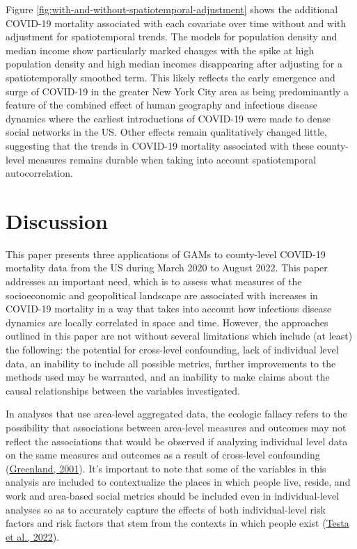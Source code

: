 \documentclass[
]{article}
\begin{document}
Figure \ref{fig:with-and-without-spatiotemporal-adjustment} shows the
additional COVID-19 mortality associated with each covariate over time without and
with adjustment for spatiotemporal trends. The models for population density
and median income show particularly marked changes with the spike at high
population density and high median incomes disappearing after adjusting for a
spatiotemporally smoothed term. This likely reflects the early emergence and
surge of COVID-19 in the greater New York City area as being predominantly a
feature of the combined effect of human geography and infectious disease
dynamics where the earliest introductions of COVID-19 were made to dense social
networks in the US. Other effects remain qualitatively changed little,
suggesting that the trends in COVID-19 mortality associated with these
county-level measures remains durable when taking into account spatiotemporal
autocorrelation.

\newpage

\hypertarget{discussion}{%
\section{Discussion}\label{discussion}}

This paper presents three applications of GAMs to county-level COVID-19
mortality data from the US during March 2020 to August 2022. This paper
addresses an important need, which is to assess what measures of the
socioeconomic and geopolitical landscape are associated with increases in
COVID-19 mortality in a way that takes into account how infectious disease
dynamics are locally correlated in space and time. However, the approaches
outlined in this paper are not without several limitations which include (at
least) the following: the potential for cross-level confounding, lack of
individual level data, an inability to include all possible metrics, further
improvements to the methods used may be warranted, and an inability to make
claims about the causal relationships between the variables investigated.

In analyses that use area-level aggregated data, the ecologic fallacy refers to
the possibility that associations between area-level measures and outcomes may
not reflect the associations that would be observed if analyzing individual
level data on the same measures and outcomes as a result of cross-level
confounding (\protect\hyperlink{ref-greenland_ecologic_2001}{Greenland, 2001}). It's important to note that
some of the variables in this analysis are included to contextualize the places
in which people live, reside, and work and area-based social metrics should be
included even in individual-level analyses so as to accurately capture the
effects of both individual-level risk factors and risk factors that stem from
the contexts in which people exist (\protect\hyperlink{ref-testa_public_2022}{Testa et al., 2022}).
\end{document}
